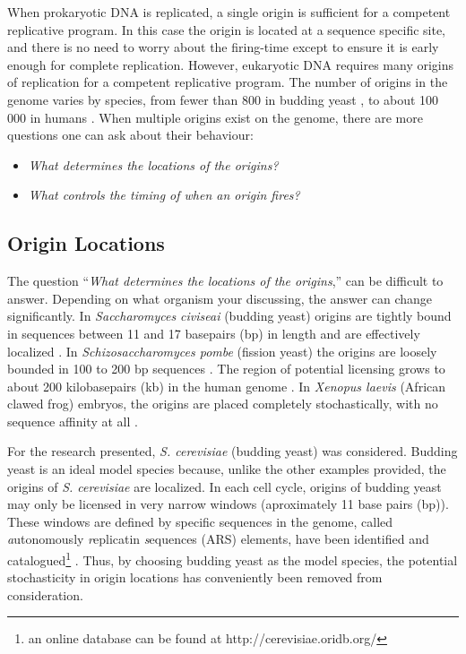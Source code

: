 	When prokaryotic DNA is replicated, a single origin is sufficient for a competent replicative program.
	In this case the origin is located at a sequence specific site, and there is no need to worry about the firing-time except to ensure it is early enough for complete replication.
	However, eukaryotic DNA requires many origins of replication for a competent replicative program.
	The number of origins in the genome varies by species, from fewer than 800 in budding yeast \cite{OriDB}, to about 100 000 in humans \cite{OriginsReview}.
	When multiple origins exist on the genome, there are more questions one can ask about their behaviour:
	\begin{itemize}
		\item \emph{What determines the locations of the origins?}
		\item \emph{What controls the timing of when an origin fires?}
	\end{itemize}
	
		\subsection{Origin Locations}
		
		The question ``\emph{What determines the locations of the origins},'' can be difficult to answer.
		Depending on what organism your discussing, the answer can change significantly.
		In \emph{Saccharomyces civiseai} (budding yeast) origins are tightly bound in sequences between 11 and 17 basepairs (bp) in length and are effectively localized \cite{ScottsPaper}.
		In \emph{Schizosaccharomyces pombe} (fission yeast) the origins are loosely bounded in 100 to 200 bp sequences \cite{OriginsReview}.
		The region of potential licensing grows to about 200 kilobasepairs (kb) in the human genome \cite{HumanGenome}.
		In \emph{Xenopus laevis} (African clawed frog) embryos, the origins are placed completely stochastically, with no sequence affinity at all \cite{FrogEmbryo}.
		
		For the research presented, \emph{S. cerevisiae} (budding yeast) was considered.
		Budding yeast is an ideal model species because, unlike the other examples provided, the origins of \emph{S. cerevisiae} are localized.
		In each cell cycle, origins of budding yeast may only be licensed in very narrow windows (aproximately 11 base pairs (bp)).
		These windows are defined by specific sequences in the genome, called \emph{a}utonomously \emph{r}eplicatin \emph{s}equences (ARS) elements, have been identified and catalogued\footnote{an online database can be found at http://cerevisiae.oridb.org/} \cite{OriDB}.
		Thus, by choosing budding yeast as the model species, the potential stochasticity in origin locations has conveniently been removed from consideration.
		
